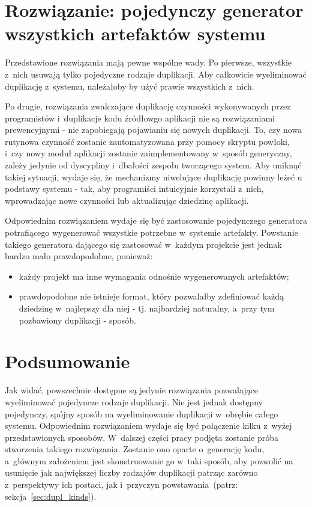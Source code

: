 \section{Rozwiązanie: pojedynczy generator wszystkich artefaktów systemu}

Przedstawione rozwiązania mają pewne wspólne wady.
Po pierwsze, wszystkie z~nich usuwają tylko pojedyczne rodzaje duplikacji.
Aby całkowicie wyeliminować duplikację z~systemu, należałoby by użyć prawie wszystkich z~nich.

Po drugie, rozwiązania zwalczające duplikację czynności wykonywanych przez programistów i~duplikacje kodu źródłowgo aplikacji nie są rozwiązaniami prewencyjnymi - nie zapobiegają pojawianiu się nowych duplikacji.
To, czy nowa rutynowa czynność zostanie zautomatyzowana przy pomocy skryptu powłoki, i~czy nowy moduł aplikacji zostanie zaimplementowany w~sposób generyczny, zależy jedynie od dyscypliny i~dbałości zespołu tworzącego system.
Aby uniknąć takiej sytuacji, wydaje się, że mechanizmy niwelujące duplikację powinny leżeć u podstawy systemu - tak, aby programiści intuicyjnie korzystali z~nich, wprowadzając nowe czynności lub aktualizując dziedzinę aplikacji.

Odpowiednim rozwiązaniem wydaje się być zastosowanie pojedynczego generatora potrafiącego wygenerować wszystkie potrzebne w~systemie artefakty.
Powstanie takiego generatora dającego się zastosować w~każdym projekcie jest jednak bardzo mało prawdopodobne, ponieważ:

\begin{itemize}
 \item każdy projekt ma inne wymagania odnośnie wygenerowanych artefaktów;
 \item prawdopodobne nie istnieje format, który pozwalałby zdefiniować każdą dziedzinę w~najlepszy dla niej - tj. najbardziej naturalny, a~przy tym pozbawiony duplikacji - sposób.
\end{itemize}



\section{Podsumowanie}

Jak widać, powszechnie dostępne są jedynie rozwiązania pozwalające wyeliminować pojedyncze rodzaje duplikacji.
Nie jest jednak dostępny pojedynczy, spójny sposób na wyeliminowanie duplikacji w~obrębie całego systemu.
Odpowiednim rozwiązaniem wydaje się być połączenie kilku z~wyżej przedstawionych sposobów.
W~dalszej części pracy podjęta zostanie próba stworzenia takiego rozwiązania.
Zostanie ono oparte o~generację kodu, a~głównym założeniem jest skonstruowanie go w~taki sposób, aby pozwolić na usunięcie jak największej liczby rodzajów duplikacji patrząc zarówno z~perspektywy ich postaci, jak i~przyczyn powstawania~(patrz: sekcja~\ref{sec:dupl_kinds}).

